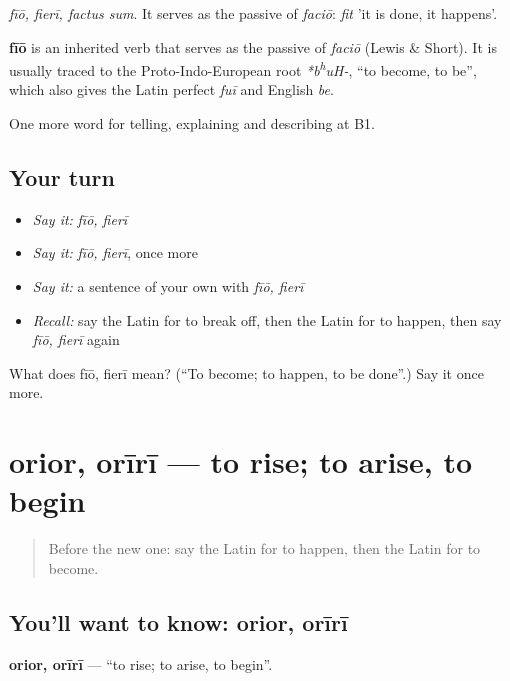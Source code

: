 \emph{fīō, fierī, factus sum}. It serves as the passive of \emph{faciō}: \emph{fit} 'it is done, it happens'.

\begin{cousinweb}
\textbf{fīō} is an inherited verb that serves as the passive of \emph{faciō} (Lewis \& Short). It is usually traced to the Proto-Indo-European root \emph{*b\textsuperscript{h}uH-}, \textquotedblleft{}to become, to be\textquotedblright{}, which also gives the Latin perfect \emph{fuī} and English \emph{be}.
\end{cousinweb}

\begin{grammarlens}[title={What you've built}]
One more word for telling, explaining and describing at B1.
\end{grammarlens}

\subsection*{Your turn}
\begin{itemize}
\raggedright
  \item \emph{Say it:} \emph{fīō, fierī}
  \item \emph{Say it:} \emph{fīō, fierī}, once more
  \item \emph{Say it:} a sentence of your own with \emph{fīō, fierī}
  \item \emph{Recall:} say the Latin for to break off, then the Latin for to happen, then say \emph{fīō, fierī} again
\end{itemize}

\begin{tcolorbox}[breakable,colback=teal!4,colframe=teal!35!black,title={Before you move on}]
What does fīō, fierī mean? (\textquotedblleft{}To become; to happen, to be done\textquotedblright{}.) Say it once more.
\end{tcolorbox}
\section[orior, orīrī]{orior, orīrī — to rise; to arise, to begin}

\label{lesson:LA-C298-orior}



\begin{quote}
Before the new one: say the Latin for to happen, then the Latin for to become.
\end{quote}

\subsection*{You'll want to know: orior, orīrī}
\textbf{orior, orīrī} — \textquotedblleft{}to rise; to arise, to begin\textquotedblright{}.

